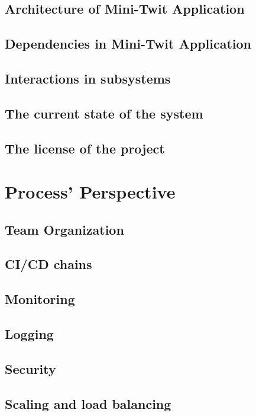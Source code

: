 \documentclass[10pt,a4paper]{article}
\numberwithin{equation}{section}
\begin{document}
\subsection{Architecture of Mini-Twit Application}

\subsection{Dependencies in Mini-Twit Application}

\subsection{Interactions in subsystems}

\newpage
\subsection{The current state of the system}

\subsection{The license of the project}

\newpage
\section{Process' Perspective}
\subsection{Team Organization}


\subsection{CI/CD chains}

\subsection{Monitoring}

\newpage
\subsection{Logging}

\subsection{Security}

\subsection{Scaling and load balancing}

\newpage
\appendix



\end{document}
